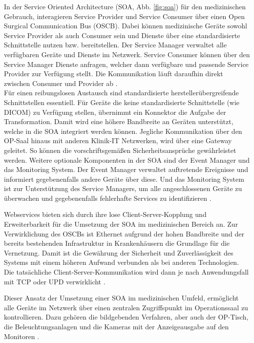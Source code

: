 In der Service Oriented Architecture (SOA, Abb. \ref{fig:soa}) für den medizinischen Gebrauch, interagieren Service Provider und Service Consumer über einen Open Surgical Communication Bus (OSCB). Dabei können medizinische Geräte sowohl Service Provider als auch Consumer sein und Dienste über eine standardisierte Schnittstelle nutzen bzw. bereitstellen. Der Service Manager verwaltet alle verfügbaren Geräte und Dienste im Netzwerk. Service Consumer können über den Service Manager Dienste anfragen, welcher dann verfügbare und passende Service Provider zur Verfügung stellt. Die Kommunikation läuft daraufhin direkt zwischen Consumer und Provider ab \cite{DerDigitaleOperationssaal}. \\ 
Für einen reibungslosen Austausch sind standardisierte herstellerübergreifende Schnittstellen essentiell. Für Geräte die keine standardisierte Schnittstelle (wie DICOM) zu Verfügung stellen, übernimmt ein Konnektor die Aufgabe der Transformation. Damit wird eine höhere Bandbreite an Geräten unterstützt, welche in die SOA integriert werden können. Jegliche Kommunikation über den OP-Saal hinaus mit anderen Klinik-IT Netzwerken, wird über eine Gateway geleitet. So können die vorschriftsgemäßen Sicherheitsansprüche gewährleistet werden. Weitere optionale Komponenten in der SOA sind der Event Manager und das Monitoring System. Der Event Manager verwaltet auftretende Ereignisse und informiert gegebenenfalls andere Geräte über diese. Und das Monitoring System ist zur Unterstützung des Service Managers, um alle angeschlossenen Geräte zu überwachen und gegebenenfalls fehlerhafte Services zu identifizieren \cite{DerDigitaleOperationssaal}. 

Webservices bieten sich durch ihre lose Client-Server-Kopplung und Erweiterbarkeit für die Umsetzung der SOA im medizinischen Bereich an. Zur Verwirklichung des OSCBs ist Ethernet aufgrund der hohen Bandbreite und der bereits bestehenden Infrastruktur in Krankenhäusern die Grundlage für die Vernetzung. Damit ist die Gewährung der Sicherheit und Zuverlässigkeit des Systems mit einem höheren Aufwand verbunden als bei anderen Technologien. Die tatsächliche Client-Server-Kommunikation wird dann je nach Anwendungsfall mit TCP oder UPD verwirklicht \cite{DerDigitaleOperationssaal}.

Dieser Ansatz der Umsetzung einer SOA im medizinischen Umfeld, ermöglicht alle Geräte im Netzwerk über einen zentralen Zugriffspunkt im Operationssaal zu kontrollieren. Dazu gehören die bildgebenden Verfahren, aber auch der OP-Tisch, die Beleuchtungsanlagen und die Kameras mit der Anzeigeausgabe auf den Monitoren \cite{DerDigitaleOperationssaal}.

